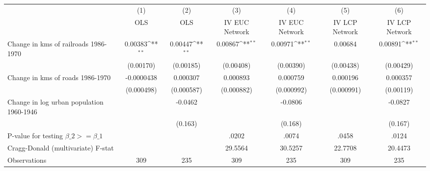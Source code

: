 {
\def\sym#1{\ifmmode^{#1}\else\(^{#1}\)\fi}
\begin{tabular}{l*{6}{c}}
\hline\hline
                &\multicolumn{1}{c}{(1)}&\multicolumn{1}{c}{(2)}&\multicolumn{1}{c}{(3)}&\multicolumn{1}{c}{(4)}&\multicolumn{1}{c}{(5)}&\multicolumn{1}{c}{(6)}\\
                &\multicolumn{1}{c}{OLS}&\multicolumn{1}{c}{OLS}&\multicolumn{1}{c}{IV EUC Network}&\multicolumn{1}{c}{IV EUC Network}&\multicolumn{1}{c}{IV LCP Network}&\multicolumn{1}{c}{IV LCP Network}\\
\hline
Change in kms of railroads 1986-1970&  0.00383\sym{**} &  0.00447\sym{**} &  0.00867\sym{**} &  0.00971\sym{**} &  0.00684         &  0.00891\sym{**} \\
                &(0.00170)         &(0.00185)         &(0.00408)         &(0.00390)         &(0.00438)         &(0.00429)         \\
[1em]
Change in kms of roads 1986-1970&-0.0000438         & 0.000307         & 0.000893         & 0.000759         & 0.000196         & 0.000357         \\
                &(0.000498)         &(0.000587)         &(0.000882)         &(0.000992)         &(0.000991)         &(0.00119)         \\
[1em]
Change in log urban population 1960-1946&                  &  -0.0462         &                  &  -0.0806         &                  &  -0.0827         \\
                &                  &  (0.163)         &                  &  (0.168)         &                  &  (0.167)         \\
\hline
P-value for testing $\beta\_{2} >= \beta\_{1}$&                  &                  &    .0202         &    .0074         &    .0458         &    .0124         \\
Cragg-Donald (multivariate) F-stat&                  &                  &  29.5564         &  30.5257         &  22.7708         &  20.4473         \\
Observations    &      309         &      235         &      309         &      235         &      309         &      235         \\
\hline\hline
\end{tabular}
}
